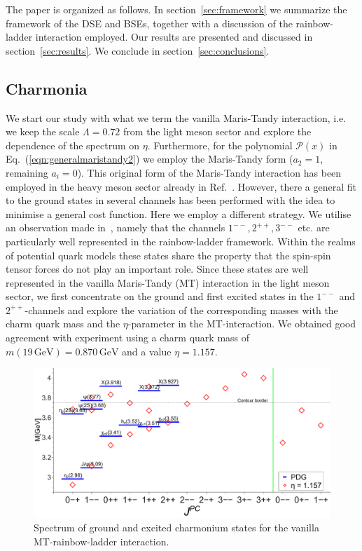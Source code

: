 The paper is organized as follows. In section~\ref{sec:framework} we summarize 
the framework of the DSE and BSEs, together with a discussion of the rainbow-ladder 
interaction employed. Our results are presented and discussed in section~\ref{sec:results}. 
We conclude in section~\ref{sec:conclusions}.

\subsection*{Charmonia}\label{sec:charm}

%
%
%
%
%
%
We start our study with what we term the vanilla Maris-Tandy interaction,
i.e. we keep the scale $\Lambda=0.72$ from the light meson sector and
explore the dependence of the spectrum on $\eta$. Furthermore, for the
polynomial $\mathcal{P}(x)$ in Eq.~(\ref{eqn:generalmaristandy2}) we 
employ the Maris-Tandy form ($a_2 = 1$, remaining $a_i =0$).
This original form of the Maris-Tandy interaction has been employed in the
heavy meson sector already in Ref.~\cite{Blank:2011ha}. However, there a general
fit to the ground states in several channels has been performed with the idea 
to minimise a general cost function. Here we employ a different strategy.
We utilise an observation made in~\cite{Fischer:2014xha}, namely that the channels 
$1^{--}, 2^{++},3^{--}$ etc. are particularly well represented in the 
rainbow-ladder framework. Within the realms of potential quark models these
states share the property that the spin-spin tensor forces do not play an 
important role. Since these states are well represented in the vanilla
Maris-Tandy (MT) interaction in the light meson sector, we first concentrate
on the ground and first excited states in the $1^{--}$ and $2^{++}$-channels
and explore the variation of the corresponding masses with the charm quark
mass and the $\eta$-parameter in the MT-interaction. We obtained good
agreement with experiment using a charm quark mass of 
$m(19 \,\mbox{GeV}) = 0.870 \,\mbox{GeV}$ and a value $\eta=1.157$.
\begin{figure}[h]
  \begin{center}
  \includegraphics[width=0.999\textwidth]{figures/spectrum_cc}
  \caption{Spectrum of ground and excited charmonium states for the vanilla MT-rainbow-ladder interaction.}
  \label{fig:charm}
  \end{center}
\end{figure}
